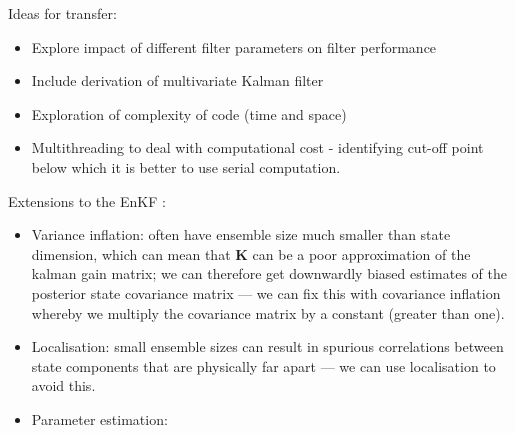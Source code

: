 Ideas for transfer:
\begin{itemize}
    \item Explore impact of different filter parameters on filter performance
    \item Include derivation of multivariate Kalman filter
    \item Exploration of complexity of code (time and space)
    \item Multithreading to deal with computational cost - identifying cut-off
        point below which it is better to use serial computation. 
\end{itemize}

Extensions to the EnKF \cite{katzfuss2016understanding}:
\begin{itemize}
    \item Variance inflation: often have ensemble size much smaller than state
        dimension, which can mean that $\mathbf{K}$ can be a poor approximation
        of the kalman gain matrix; we can therefore get downwardly biased
        estimates of the posterior state covariance matrix ---  we can fix this
        with covariance inflation whereby we multiply the covariance matrix by a
        constant (greater than one).
    \item Localisation: small ensemble sizes can result in spurious
        correlations between state components that are physically far apart ---
        we can use localisation to avoid this.
    \item Parameter estimation: 
\end{itemize}
